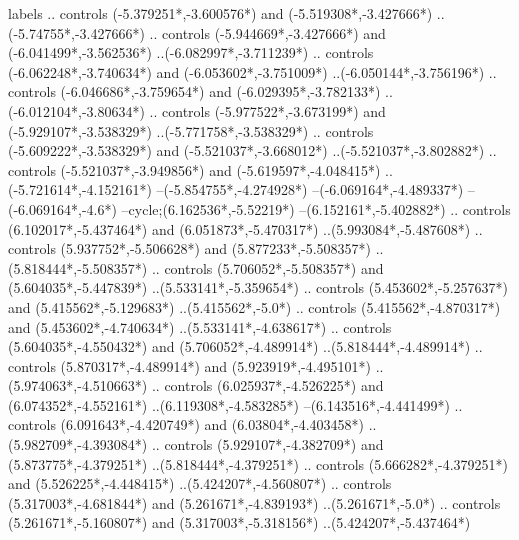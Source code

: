 {\begin{scope}[x=1mm,y=1mm,line width=\SCstroke mm,line cap=round,line join=round]
\begin{SCpart}{labels}
.. controls ({-5.379251*\SCF},{-3.600576*\SCF}) and ({-5.519308*\SCF},{-3.427666*\SCF}) ..({-5.74755*\SCF},{-3.427666*\SCF})
.. controls ({-5.944669*\SCF},{-3.427666*\SCF}) and ({-6.041499*\SCF},{-3.562536*\SCF}) ..({-6.082997*\SCF},{-3.711239*\SCF})
.. controls ({-6.062248*\SCF},{-3.740634*\SCF}) and ({-6.053602*\SCF},{-3.751009*\SCF}) ..({-6.050144*\SCF},{-3.756196*\SCF})
.. controls ({-6.046686*\SCF},{-3.759654*\SCF}) and ({-6.029395*\SCF},{-3.782133*\SCF}) ..({-6.012104*\SCF},{-3.80634*\SCF})
.. controls ({-5.977522*\SCF},{-3.673199*\SCF}) and ({-5.929107*\SCF},{-3.538329*\SCF}) ..({-5.771758*\SCF},{-3.538329*\SCF})
.. controls ({-5.609222*\SCF},{-3.538329*\SCF}) and ({-5.521037*\SCF},{-3.668012*\SCF}) ..({-5.521037*\SCF},{-3.802882*\SCF})
.. controls ({-5.521037*\SCF},{-3.949856*\SCF}) and ({-5.619597*\SCF},{-4.048415*\SCF}) ..({-5.721614*\SCF},{-4.152161*\SCF})
--({-5.854755*\SCF},{-4.274928*\SCF})
--({-6.069164*\SCF},{-4.489337*\SCF})
--({-6.069164*\SCF},{-4.6*\SCF})
--cycle; ({6.162536*\SCF},{-5.52219*\SCF})
--({6.152161*\SCF},{-5.402882*\SCF})
.. controls ({6.102017*\SCF},{-5.437464*\SCF}) and ({6.051873*\SCF},{-5.470317*\SCF}) ..({5.993084*\SCF},{-5.487608*\SCF})
.. controls ({5.937752*\SCF},{-5.506628*\SCF}) and ({5.877233*\SCF},{-5.508357*\SCF}) ..({5.818444*\SCF},{-5.508357*\SCF})
.. controls ({5.706052*\SCF},{-5.508357*\SCF}) and ({5.604035*\SCF},{-5.447839*\SCF}) ..({5.533141*\SCF},{-5.359654*\SCF})
.. controls ({5.453602*\SCF},{-5.257637*\SCF}) and ({5.415562*\SCF},{-5.129683*\SCF}) ..({5.415562*\SCF},{-5.0*\SCF})
.. controls ({5.415562*\SCF},{-4.870317*\SCF}) and ({5.453602*\SCF},{-4.740634*\SCF}) ..({5.533141*\SCF},{-4.638617*\SCF})
.. controls ({5.604035*\SCF},{-4.550432*\SCF}) and ({5.706052*\SCF},{-4.489914*\SCF}) ..({5.818444*\SCF},{-4.489914*\SCF})
.. controls ({5.870317*\SCF},{-4.489914*\SCF}) and ({5.923919*\SCF},{-4.495101*\SCF}) ..({5.974063*\SCF},{-4.510663*\SCF})
.. controls ({6.025937*\SCF},{-4.526225*\SCF}) and ({6.074352*\SCF},{-4.552161*\SCF}) ..({6.119308*\SCF},{-4.583285*\SCF})
--({6.143516*\SCF},{-4.441499*\SCF})
.. controls ({6.091643*\SCF},{-4.420749*\SCF}) and ({6.03804*\SCF},{-4.403458*\SCF}) ..({5.982709*\SCF},{-4.393084*\SCF})
.. controls ({5.929107*\SCF},{-4.382709*\SCF}) and ({5.873775*\SCF},{-4.379251*\SCF}) ..({5.818444*\SCF},{-4.379251*\SCF})
.. controls ({5.666282*\SCF},{-4.379251*\SCF}) and ({5.526225*\SCF},{-4.448415*\SCF}) ..({5.424207*\SCF},{-4.560807*\SCF})
.. controls ({5.317003*\SCF},{-4.681844*\SCF}) and ({5.261671*\SCF},{-4.839193*\SCF}) ..({5.261671*\SCF},{-5.0*\SCF})
.. controls ({5.261671*\SCF},{-5.160807*\SCF}) and ({5.317003*\SCF},{-5.318156*\SCF}) ..({5.424207*\SCF},{-5.437464*\SCF})

\end{SCpart}
\end{scope}}
